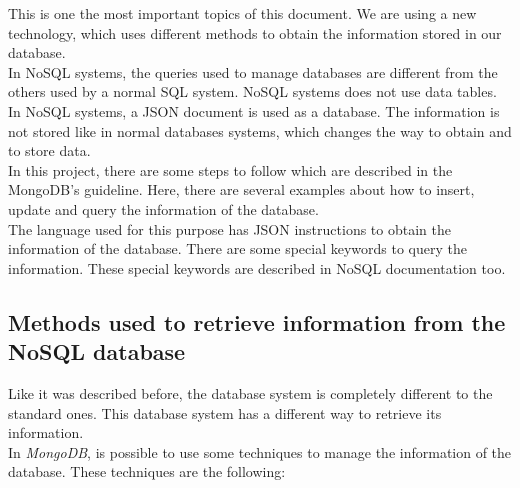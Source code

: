This is one the most important topics of this document. We are using a new technology, which uses different methods to obtain the information stored in our database.\\

In NoSQL systems, the queries used to manage databases are different from the others used by a normal SQL system. NoSQL systems does not use data tables. In NoSQL systems, a JSON document is used as a database. The information is not stored like in normal databases systems, which changes the way to obtain and to store data.\\

In this project, there are some steps to follow which are described in the MongoDB's guideline. Here, there are several examples about how to insert, update and query the information of the database.\\

The language used for this purpose has JSON instructions to obtain the information of the database. There are some special keywords to query the information. These special keywords are described in NoSQL documentation too.

\subsection{Methods used to retrieve information from the NoSQL database}

Like it was described before, the database system is completely different to the standard ones. This database system has a different way to retrieve its information.\\

In \textit{MongoDB}, is possible to use some techniques to manage the information of the database. These techniques are the following:

